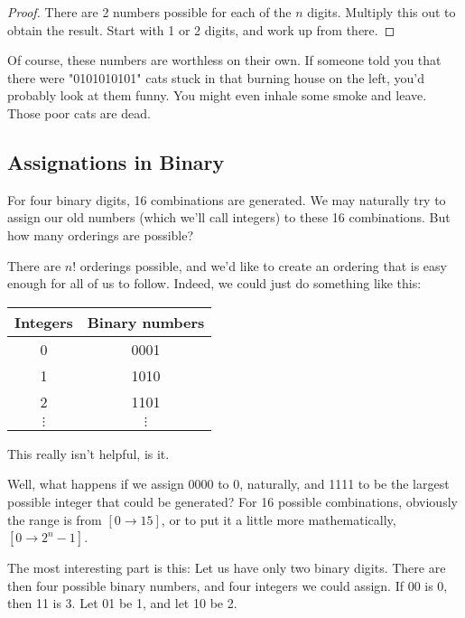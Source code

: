 \documentclass[12pt]{article}
\begin{document}
\begin{proof}
    There are 2 numbers possible for each of the $n$ digits. Multiply
    this out to obtain the result. Start with 1 or 2 digits, and work up from there.
\end{proof}


    Of course, these numbers are worthless on their own. If someone told you that there were "0101010101"
    cats stuck in that burning house on the left, you'd probably look at them funny. You might even inhale some smoke
    and leave. Those poor cats are dead.

\subsection{Assignations in Binary}

    For four binary digits, 16 combinations are generated.
    We may naturally try to assign our old numbers (which we'll call integers) to these 16 combinations.
    But how many orderings are possible?

    There are $n!$ orderings possible, and we'd like to create an ordering
    that is easy enough for all of us to follow. Indeed, we could
    just do something like this:

    \newpage

    \begin{center}
        \begin{tabular}{|c|c|}
          \hline
          Integers & Binary numbers \\
          \hline
          0 & 0001 \\
          1 & 1010 \\
          2 & 1101 \\
          $\vdots$ & $\vdots$\\
          \hline
                     
        \end{tabular}
    \end{center}
    This really isn't helpful, is it.

    Well, what happens if we assign 0000 to 0, naturally, and 1111
    to be the largest possible integer that could be generated? For 16 possible
    combinations, obviously the range is from $[0 \rightarrow 15]$, or
    to put it a little more mathematically, $[0 \rightarrow 2^n - 1]$.

    The most interesting part is this: Let us have only two binary digits. There
    are then four possible binary numbers, and four integers
    we could assign. If 00 is 0, then 11 is 3. Let 01 be 1, and let
    10 be 2.
\end{document}
